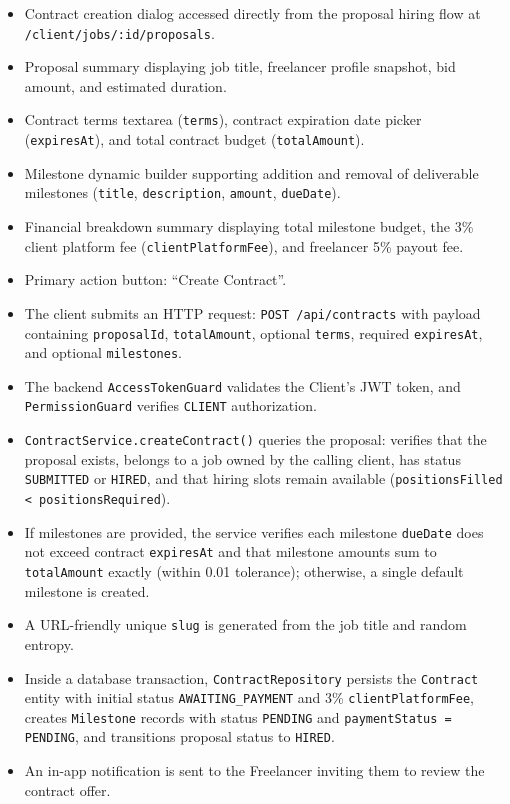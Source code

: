 \begin{itemize}[leftmargin=1.6em,topsep=3pt,itemsep=2pt,parsep=0pt,label=$\bullet$]
      \item Contract creation dialog accessed directly from the proposal hiring flow at \texttt{/\allowbreak{}client/\allowbreak{}jobs/\allowbreak{}:\allowbreak{}id/\allowbreak{}proposals}.
      \item Proposal summary displaying job title, freelancer profile snapshot, bid amount, and estimated duration.
      \item Contract terms textarea (\texttt{terms}), contract expiration date picker (\texttt{expiresAt}), and total contract budget (\texttt{totalAmount}).
      \item Milestone dynamic builder supporting addition and removal of deliverable milestones (\texttt{title}, \texttt{description}, \texttt{amount}, \texttt{dueDate}).
      \item Financial breakdown summary displaying total milestone budget, the 3\% client platform fee (\texttt{clientPlatformFee}), and freelancer 5\% payout fee.
      \item Primary action button: ``Create Contract''.
\end{itemize}

\begin{itemize}[leftmargin=1.6em,topsep=3pt,itemsep=2pt,parsep=0pt,label=$\bullet$]
      \item The client submits an HTTP request: \texttt{POST /\allowbreak{}api/\allowbreak{}contracts} with payload containing \texttt{proposalId}, \texttt{totalAmount}, optional \texttt{terms}, required \texttt{expiresAt}, and optional \texttt{milestones}.
      \item The backend \texttt{AccessTokenGuard} validates the Client's JWT token, and \texttt{PermissionGuard} verifies \texttt{CLIENT} authorization.
      \item \texttt{ContractService.createContract()} queries the proposal: verifies that the proposal exists, belongs to a job owned by the calling client, has status \texttt{SUBMITTED} or \texttt{HIRED}, and that hiring slots remain available (\texttt{positionsFilled < positionsRequired}).
      \item If milestones are provided, the service verifies each milestone \texttt{dueDate} does not exceed contract \texttt{expiresAt} and that milestone amounts sum to \texttt{totalAmount} exactly (within 0.01 tolerance); otherwise, a single default milestone is created.
      \item A URL-friendly unique \texttt{slug} is generated from the job title and random entropy.
      \item Inside a database transaction, \texttt{ContractRepository} persists the \texttt{Contract} entity with initial status \texttt{AWAITING\_PAYMENT} and 3\% \texttt{clientPlatformFee}, creates \texttt{Milestone} records with status \texttt{PENDING} and \texttt{paymentStatus = PENDING}, and transitions proposal status to \texttt{HIRED}.
      \item An in-app notification is sent to the Freelancer inviting them to review the contract offer.
\end{itemize}

